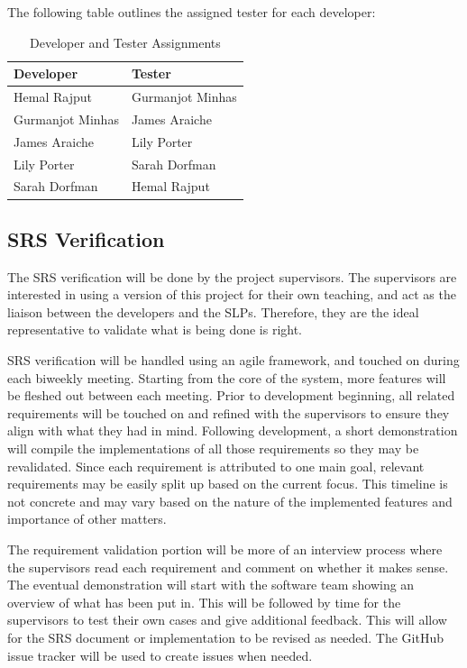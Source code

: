 \documentclass[12pt, titlepage]{article}
\begin{document}
The following table outlines the assigned tester for each developer:

\begin{table}[h!]
    \centering
    \begin{tabular}{|l|l|}
        \hline
        \textbf{Developer} & \textbf{Tester} \\ \hline
        Hemal Rajput & Gurmanjot Minhas \\ \hline
        Gurmanjot Minhas & James Araiche \\ \hline
        James Araiche & Lily Porter \\ \hline
        Lily Porter & Sarah Dorfman \\ \hline
        Sarah Dorfman & Hemal Rajput \\ \hline
    \end{tabular}
    \caption{Developer and Tester Assignments}\label{tab:tester-assignments}
\end{table}

\subsection{SRS Verification}

The SRS verification will be done by the project supervisors. The supervisors 
are interested in using a version of this project for their own teaching, and 
act as the liaison between the developers and the SLPs. Therefore, they are 
the ideal representative to validate what is being done is right. 

SRS verification will be handled using an agile framework, and touched on 
during each biweekly meeting. Starting from the core of the system, more 
features will be fleshed out between each meeting. Prior to development 
beginning, all related requirements will be touched on and refined with the 
supervisors to ensure they align with what they had in mind. Following 
development, a short demonstration will compile the implementations of all 
those requirements so they may be revalidated. Since each requirement is 
attributed to one main goal, relevant requirements may be easily split up 
based on the current focus. This timeline is not concrete and may vary based 
on the nature of the implemented features and importance of other matters. 

The requirement validation portion will be more of an interview process where 
the supervisors read each requirement and comment on whether it makes sense. 
The eventual demonstration will start with the software team showing an 
overview of what has been put in. This will be followed by time for the 
supervisors to test their own cases and give additional feedback. This will 
allow for the SRS document or implementation to be revised as needed. The 
GitHub issue tracker will be used to create issues when needed. 
\end{document}
